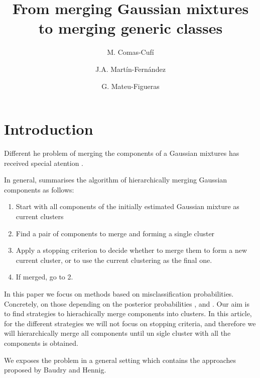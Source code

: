 \documentclass[10pt, a4paper]{article}
\title{From merging Gaussian mixtures to merging generic classes}
\author{M. Comas-Cufí \and J.A. Martín-Fernández \and G. Mateu-Figueras}
\newtheorem{prob}{Problem}
\begin{document}
\maketitle

\section{Introduction}

Different he problem of merging the components of a Gaussian mixtures has received special atention \cite{melnykov2013distribution,lee2004combining,hennig2010methods,baudry2010combining,pastore2013merging}. 

In general, \cite{hennig2010methods} summarises the algorithm of hierarchically merging Gaussian components as follows:
\begin{enumerate}
\item Start with all components of the initially estimated Gaussian mixture as current clusters
\item Find a pair of components to merge and forming a single cluster
\item Apply a stopping criterion to decide whether to merge them to form a new current cluster, or to use the current clustering as the final one.
\item If merged, go to 2.
\end{enumerate}

In this paper we focus on methods based on misclassification probabilities. Concretely, on those depending on the posterior probabilities \citep{melnykov2013distribution}, \citep{baudry2010combining} and \citep[in \textsc{demp} approach]{hennig2010methods}. Our aim is to find strategies to hierachically merge components into clusters. In this article, for the different strategies we will not focus on stopping criteria, and therefore we will hierarchically merge all components until un sigle cluster with all the components is obtained.


We exposes the problem in a general setting which contains the approaches proposed by Baudry and Hennig.

% 
%
\end{document}
